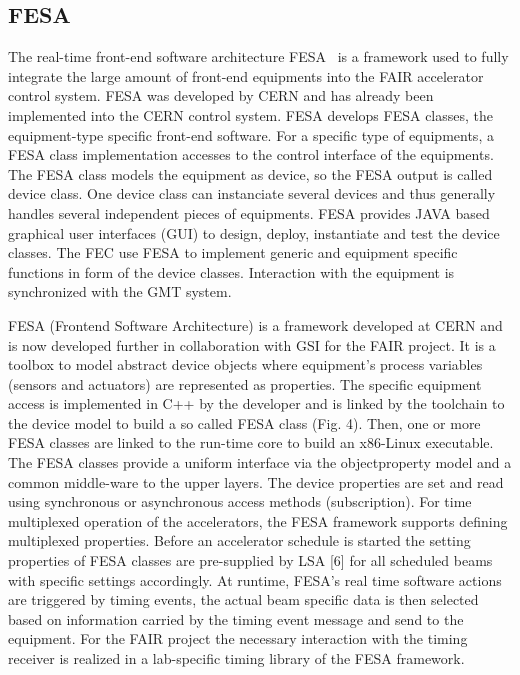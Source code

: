 \subsection{FESA}
The real-time front-end software architecture \gls{FESA}~\cite{hoffmann_fesafront-end_2008} is a framework used to fully integrate the large amount of front-end equipments into the FAIR accelerator control system. FESA was developed by CERN and has already been implemented into the CERN control system. FESA develops FESA classes, the equipment-type specific front-end software. For a specific type of equipments, a FESA class implementation accesses to the control interface of the equipments. The FESA class models the equipment as device, so the FESA output is called device class. One device class can instanciate several devices and thus generally handles several independent pieces of equipments.  FESA provides JAVA based graphical user interfaces (GUI) to design, deploy, instantiate and test the device classes. The FEC use FESA to implement generic and equipment specific functions in form of the device classes. Interaction with the equipment is synchronized with the GMT system. 

FESA (Frontend Software Architecture) is a framework developed at CERN and is now developed further in collaboration with GSI for the FAIR project. It is a toolbox to model abstract device objects where equipment’s process variables (sensors and actuators) are represented as properties. The specific equipment access is implemented in C++ by the developer and is linked by the toolchain
to the device model to build a so called FESA class (Fig. 4). Then, one or more FESA classes are linked to the run-time core to build an x86-Linux executable. The
FESA classes provide a uniform interface via the objectproperty model and a common middle-ware to the upper layers. The device properties are set and read using synchronous or asynchronous access methods (subscription). For time multiplexed operation of the accelerators, the FESA framework supports defining multiplexed properties. Before an accelerator schedule is started the setting properties of FESA classes are pre-supplied by LSA [6] for all scheduled beams with specific settings accordingly. At runtime, FESA’s real time software actions are triggered by timing events, the actual beam specific data is then selected based on information carried by the timing event message and send to the equipment. For the FAIR project the necessary interaction with the timing receiver is realized in a
lab-specific timing library of the FESA framework.


